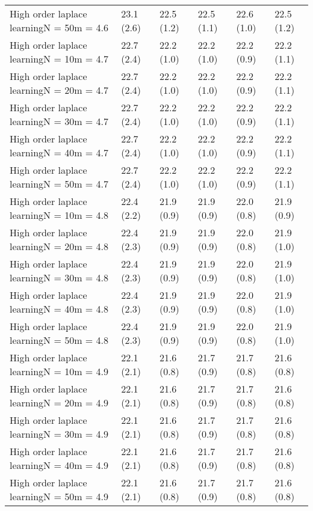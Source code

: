 \documentclass{article}
\begin{document}
\begin{table*}[t!]
\begin{center}
\begin{small}
\begin{sc}
\begin{tabular}{llllll}
High order laplace learningN = 50m = 4.6&23.1 (2.6)      &22.5 (1.2)      &22.5 (1.1)      &22.6 (1.0)      &22.5 (1.2)      \\
High order laplace learningN = 10m = 4.7&22.7 (2.4)      &22.2 (1.0)      &22.2 (1.0)      &22.2 (0.9)      &22.2 (1.1)      \\
High order laplace learningN = 20m = 4.7&22.7 (2.4)      &22.2 (1.0)      &22.2 (1.0)      &22.2 (0.9)      &22.2 (1.1)      \\
High order laplace learningN = 30m = 4.7&22.7 (2.4)      &22.2 (1.0)      &22.2 (1.0)      &22.2 (0.9)      &22.2 (1.1)      \\
High order laplace learningN = 40m = 4.7&22.7 (2.4)      &22.2 (1.0)      &22.2 (1.0)      &22.2 (0.9)      &22.2 (1.1)      \\
High order laplace learningN = 50m = 4.7&22.7 (2.4)      &22.2 (1.0)      &22.2 (1.0)      &22.2 (0.9)      &22.2 (1.1)      \\
High order laplace learningN = 10m = 4.8&22.4 (2.2)      &21.9 (0.9)      &21.9 (0.9)      &22.0 (0.8)      &21.9 (0.9)      \\
High order laplace learningN = 20m = 4.8&22.4 (2.3)      &21.9 (0.9)      &21.9 (0.9)      &22.0 (0.8)      &21.9 (1.0)      \\
High order laplace learningN = 30m = 4.8&22.4 (2.3)      &21.9 (0.9)      &21.9 (0.9)      &22.0 (0.8)      &21.9 (1.0)      \\
High order laplace learningN = 40m = 4.8&22.4 (2.3)      &21.9 (0.9)      &21.9 (0.9)      &22.0 (0.8)      &21.9 (1.0)      \\
High order laplace learningN = 50m = 4.8&22.4 (2.3)      &21.9 (0.9)      &21.9 (0.9)      &22.0 (0.8)      &21.9 (1.0)      \\
High order laplace learningN = 10m = 4.9&22.1 (2.1)      &21.6 (0.8)      &21.7 (0.9)      &21.7 (0.8)      &21.6 (0.8)      \\
High order laplace learningN = 20m = 4.9&22.1 (2.1)      &21.6 (0.8)      &21.7 (0.9)      &21.7 (0.8)      &21.6 (0.8)      \\
High order laplace learningN = 30m = 4.9&22.1 (2.1)      &21.6 (0.8)      &21.7 (0.9)      &21.7 (0.8)      &21.6 (0.8)      \\
High order laplace learningN = 40m = 4.9&22.1 (2.1)      &21.6 (0.8)      &21.7 (0.9)      &21.7 (0.8)      &21.6 (0.8)      \\
High order laplace learningN = 50m = 4.9&22.1 (2.1)      &21.6 (0.8)      &21.7 (0.9)      &21.7 (0.8)      &21.6 (0.8)      \\

\end{tabular}
\end{sc}
\end{small}
\end{center}
\end{table*}
\end{document}
